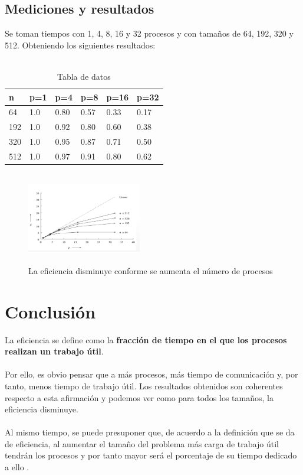 \documentclass[10pt,twocolumn,a4paper]{article}
\begin{document}
\subsection{Mediciones y resultados}
Se toman tiempos con 1, 4, 8, 16 y 32 procesos y con tamaños de 64, 192, 320 y 512. Obteniendo los siguientes resultados: \\ \\

\begin{table}[H]
\begin{center}
\begin{tabular}{|l l l l l l|}
\hline
n&p=1&p=4&p=8&p=16&p=32\\
\hline
\hline
64		&1.0		&0.80	&0.57	&0.33	&0.17\\
192		&1.0		&0.92	&0.80	&0.60	&0.38\\ 
320		&1.0		&0.95	&0.87	&0.71	&0.50\\ 
512		&1.0		&0.97	&0.91	&0.80	&0.62\\ 
\hline
\end{tabular}
\caption{Tabla de datos}
\label{Tabla de datos}
\end{center}
\end{table}

\begin{figure}[H]
\begin{center}
\includegraphics[height=4cm, width=5cm]{grafico}
\caption{La eficiencia disminuye conforme se aumenta el número de procesos}
\end{center}
\end{figure}

\section{Conclusión}
La eficiencia se define como la \textbf{fracción de tiempo en el que los procesos realizan un trabajo útil}.\\ \\
Por ello, es obvio pensar que a más procesos, más tiempo de comunicación y, por tanto, menos tiempo de trabajo útil. Los resultados obtenidos son coherentes respecto a esta afirmación y podemos ver como para todos los tamaños, la eficiencia disminuye.\\ \\
Al mismo tiempo, se puede presuponer que, de acuerdo a la definición que se da de eficiencia, al aumentar el tamaño del problema más carga de trabajo útil tendrán los procesos y por tanto mayor  será el porcentaje de su tiempo dedicado a ello .


\end{document}
